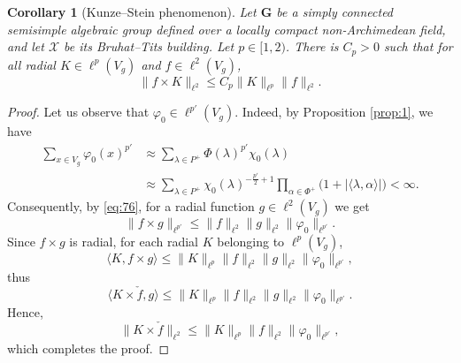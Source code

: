 \documentclass[11pt]{amsart}
\newcommand{\scrX}{\mathscr{X}}
\newcommand{\vphi}{\varphi}
\newcommand{\sprod}[2]{\langle {#1}, {#2} \rangle}
\theoremstyle{plain}
\newtheorem{corollary}[theorem]{Corollary}
\theoremstyle{definition}
\numberwithin{equation}{section}
\begin{document}
\begin{corollary}[Kunze--Stein phenomenon]
	\label{cor:A:2}
	Let $\mathbf{G}$ be a simply connected semisimple algebraic group defined over a locally compact non-Archimedean field,
	and let $\scrX$ be its Bruhat--Tits building. Let $p \in [1, 2)$. There is $C_p > 0$ such that for all radial
	$K \in \ell^p(V_g)$ and $f \in \ell^2(V_g)$,
	\[
		\|f \times K\|_{\ell^2} \leqslant C_p \|K\|_{\ell^p} \|f\|_{\ell^2}.
	\]
\end{corollary}
\begin{proof}
	Let us observe that $\vphi_0 \in \ell^{p'}(V_g)$. Indeed, by Proposition \ref{prop:1}, we have
	\begin{align*}
		\sum_{x \in V_g} 
		\vphi_0(x)^{p'} 
		&\approx
		\sum_{\lambda \in P^+} \Phi(\lambda)^{p'} \chi_0(\lambda) \\
		&\approx
		\sum_{\lambda \in P^+} \chi_0(\lambda)^{-\frac{p'}2+1} \prod_{\alpha \in \Phi^+} 
		\big(1 + |\sprod{\lambda}{\alpha}|\big) < \infty.
	\end{align*}
	Consequently, by \eqref{eq:76}, for a radial function $g \in \ell^2(V_g)$ we get
	\[
		\|f \times g\|_{\ell^{p'}} 	\leqslant \|f\|_{\ell^2} \|g\|_{\ell^2} \|\vphi_0\|_{\ell^{p'}}.
	\]
	Since $f \times g$ is radial, for each radial $K$ belonging to $\ell^p(V_g)$,
	\[
		\sprod{K}{f \times g} \leqslant \|K\|_{\ell^p} \|f\|_{\ell^2} \|g\|_{\ell^2} \|\vphi_0\|_{\ell^{p'}},
	\]
	thus
	\[
		\sprod{K \times \check{f}}{g} \leqslant \|K\|_{\ell^p} \|f\|_{\ell^2} \|g\|_{\ell^2} \|\vphi_0\|_{\ell^{p'}}.
	\]
	Hence,
	\[
		\|K \times \check{f}\|_{\ell^2} 
		\leqslant 
		\|K\|_{\ell^p} \|f\|_{\ell^2} 
		\|\vphi_0\|_{\ell^{p'}},
	\]
	which completes the proof.
\end{proof}


	
\end{document}
